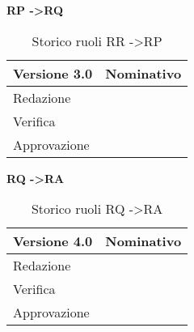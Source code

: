 \textbf{RP -\textgreater RQ}

\begin{table}[h]
\begin{center}

\begin{tabular}{p{} p{}}
\toprule
\textbf{Versione 3.0}	&	\textbf{Nominativo}\\
\midrule
\midrule
Redazione	&	\MB \\
\midrule
Verifica &	\EZ	\\
\midrule
Approvazione	&	\VP	\\
\bottomrule
\end{tabular}
\caption{Storico ruoli RR -\textgreater RP}
\label{tabVers1}
\end{center}
\end{table}

\newpage
\textbf{RQ -\textgreater RA}

\begin{table}[h]
\begin{center}

\begin{tabular}{p{} p{}}
\toprule
\textbf{Versione 4.0}	&	\textbf{Nominativo}\\
\midrule
\midrule
Redazione	&	\DC \\
\midrule
Verifica &	\SL	\\
\midrule
Approvazione	&	\MB	\\
\bottomrule
\end{tabular}
\caption{Storico ruoli RQ -\textgreater RA}
\label{tabVers1}
\end{center}
\end{table}
